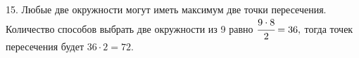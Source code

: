 15. Любые две окружности могут иметь максимум две точки пересечения. Количество способов выбрать две окружности из 9 равно $\cfrac{9\cdot8}{2}=36,$ тогда точек пересечения будет $36\cdot2=72.$\\
